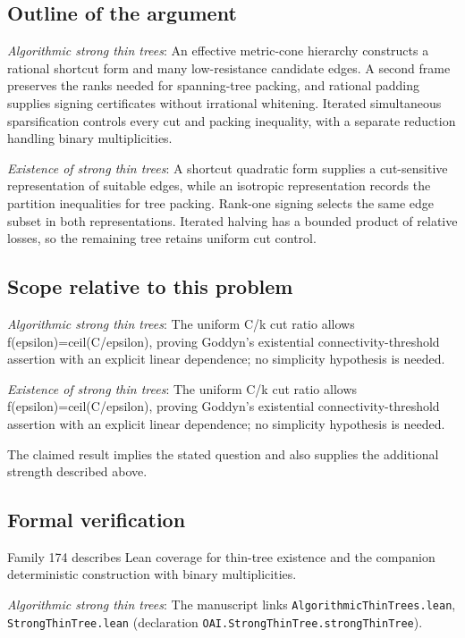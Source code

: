 \documentclass[11pt]{article}
\begin{document}
\subsection{Outline of the argument}
\textit{Algorithmic strong thin trees}: An effective metric-cone hierarchy constructs a rational shortcut form and many low-resistance candidate edges. A second frame preserves the ranks needed for spanning-tree packing, and rational padding supplies signing certificates without irrational whitening. Iterated simultaneous sparsification controls every cut and packing inequality, with a separate reduction handling binary multiplicities.

\textit{Existence of strong thin trees}: A shortcut quadratic form supplies a cut-sensitive representation of suitable edges, while an isotropic representation records the partition inequalities for tree packing. Rank-one signing selects the same edge subset in both representations. Iterated halving has a bounded product of relative losses, so the remaining tree retains uniform cut control.

\subsection{Scope relative to this problem}
\textit{Algorithmic strong thin trees}: The uniform C/k cut ratio allows f(epsilon)=ceil(C/epsilon), proving Goddyn’s existential connectivity-threshold assertion with an explicit linear dependence; no simplicity hypothesis is needed.

\textit{Existence of strong thin trees}: The uniform C/k cut ratio allows f(epsilon)=ceil(C/epsilon), proving Goddyn’s existential connectivity-threshold assertion with an explicit linear dependence; no simplicity hypothesis is needed.

The claimed result implies the stated question and also supplies the additional strength described above.

\subsection{Formal verification}
Family 174 describes Lean coverage for thin-tree existence and the companion deterministic construction with binary multiplicities.

\textit{Algorithmic strong thin trees}: The manuscript links \texttt{AlgorithmicThinTrees.lean}, \texttt{StrongThinTree.lean} (declaration \texttt{OAI.StrongThinTree.strongThinTree}).
\end{document}
